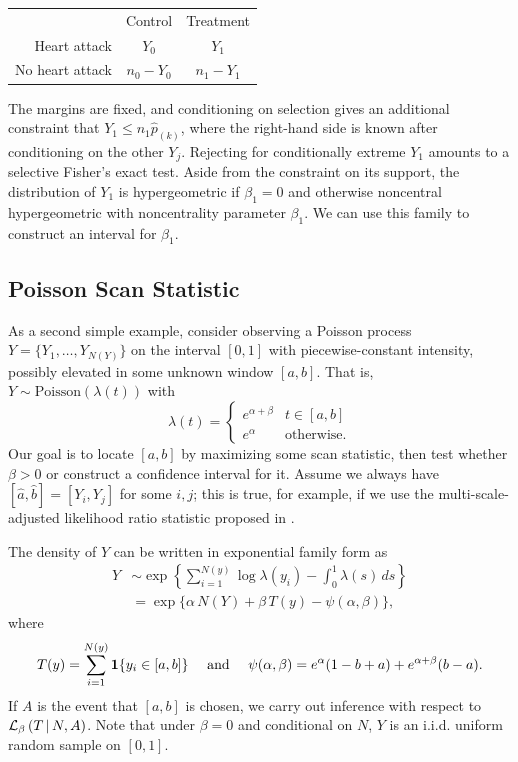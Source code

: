 \documentclass{article}
\theoremstyle{definition}
\newcommand{\cL}{\mathcal{L}}
\begin{document}
\renewcommand{\arraystretch}{2}

\begin{center}
\begin{tabular}{ r|c|c| }
\multicolumn{1}{r}{}
 &  \multicolumn{1}{c}{Control}
 & \multicolumn{1}{c}{Treatment} \\
\cline{2-3}
Heart attack & $Y_0$ & $Y_1$ \\
\cline{2-3}
No heart attack & $n_0-Y_0$ & $n_1-Y_1$ \\
\cline{2-3}
\end{tabular}
\end{center}

The margins are fixed, and conditioning on selection gives an additional constraint that $Y_1 \leq n_1 \hat p_{(k)}$, where the right-hand side is known after conditioning on the other $Y_j$. Rejecting for conditionally extreme $Y_1$ amounts to a selective Fisher's exact test. Aside from the constraint on its support, the distribution of $Y_1$ is hypergeometric if $\beta_1=0$ and otherwise noncentral hypergeometric with noncentrality parameter $\beta_1$. We can use this family to construct an interval for $\beta_1$.

\subsection{Poisson Scan Statistic}\label{sec:poisson}

As a second simple example, consider observing a Poisson process $Y=\{Y_1,\ldots,Y_{N(Y)}\}$ on the interval $[0,1]$ with piecewise-constant intensity, possibly elevated in some unknown window $[a,b]$. That is, $Y\sim \text{Poisson}(\lambda(t))$ with
\begin{equation}
  \lambda(t) = \begin{cases}
    e^{\alpha+\beta} &  t\in[a,b]\\
    e^\alpha &  \text{otherwise.}
  \end{cases}
\end{equation}
Our goal is to locate $[a,b]$ by maximizing some scan statistic, then test whether $\beta>0$ or construct a confidence interval for it. Assume we always have $[\hat a, \hat b] = [Y_i,Y_j]$ for some $i,j$; this is true, for example, if we use the multi-scale-adjusted likelihood ratio statistic proposed in \citet{rivera2013optimal}.


The density of $Y$ can be written in exponential family form as
\begin{align}
  Y
  &\sim \exp\left\{ \sum_{i=1}^{N(y)} \log \lambda(y_i)
    - \int_0^1 \lambda(s)\,ds\right\} \\[3pt]
  & = \exp\big\{\alpha\, N(Y) + \beta \,T(y) - \psi(\alpha,\beta)\big\},
\end{align}
where
\begin{equation}
  T(y) = \sum_{i=1}^{N(y)} \mathbf{1}\{y_i\in [a,b]\} \quad\text{ and }\quad \psi(\alpha,\beta) = e^\alpha(1-b+a) + e^{\alpha+\beta}(b-a).
\end{equation}
If $A$ is the event that $[a,b]$ is chosen, we carry out inference with respect to $\cL_\beta\left(T \gv N, A\right)$. Note that under $\beta=0$ and conditional on $N$, $Y$ is an i.i.d. uniform random sample on $[0,1]$.
\end{document}
